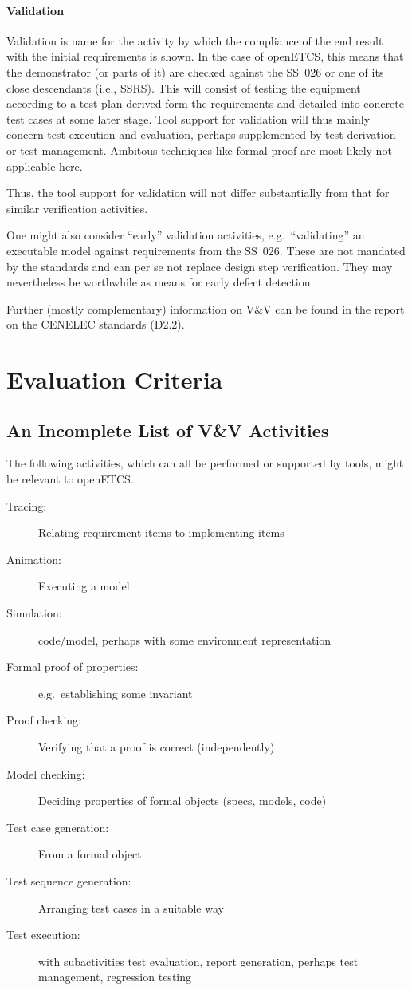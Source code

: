 \documentclass{template/openetcs_article}
\begin{document}
\paragraph{Validation}
Validation is name for the activity by which the compliance of the end
result with the initial requirements is shown. In the case of
openETCS, this means that the demonstrator (or parts of it) are
checked against the SS~026 or one of its close descendants (i.e.,
SSRS). This will consist of testing the equipment according to a test
plan derived form the requirements and detailed into concrete test
cases at some later stage. Tool support for validation will thus
mainly concern test execution and evaluation, perhaps supplemented by
test derivation or test management. Ambitous techniques like formal
proof are most likely not applicable here.

Thus, the tool support for validation will not differ substantially
from that for similar verification activities.

One might also consider ``early'' validation activities, e.g.\
``validating'' an executable model against requirements from the
SS~026. These are not mandated by the standards and can per se not
replace design step verification. They may nevertheless be worthwhile
as means for early defect detection.

Further (mostly complementary) information on V\&V can be found in the
report on the CENELEC standards (D2.2).


\section{Evaluation Criteria}

\subsection{An Incomplete List of V\&V Activities}
\label{sec:table-verif-activ}

The following activities, which can all be performed or supported by
tools, might be relevant to openETCS. 
\begin{description}
\item[Tracing:] Relating requirement items to implementing items
\item[Animation:] Executing a model 
\item[Simulation:] code/model, perhaps with some environment representation 
\item[Formal proof of properties:] e.g.\ establishing some invariant
\item[Proof checking:] Verifying that a proof is correct (independently)
\item[Model checking:] Deciding properties of formal objects (specs,
  models, code)
\item[Test case generation:] From a formal object
\item[Test sequence generation:] Arranging test cases in a suitable way
\item[Test execution:] with subactivities test evaluation, report
  generation, perhaps test management, regression testing
\end{description}
\end{document}
